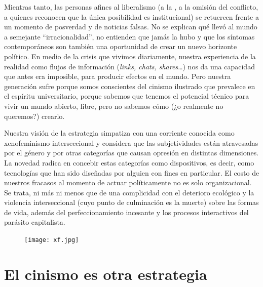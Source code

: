 Mientras tanto, las personas afines al liberalismo (a la , a la omisión del conflicto, a quienes reconocen que la única posibilidad es institucional) se retuercen frente a un momento de posverdad y de noticias falsas. No se explican qué llevó al mundo a semejante \enquote{irracionalidad},\revquotes{} no entienden que jamás la hubo y que los síntomas contemporáneos son también una oportunidad de crear un nuevo horizonte político. En medio de la crisis que vivimos diariamente, nuestra experiencia de la realidad como flujos de información (\emph{links, chats, shares}\ldots{}) nos da una capacidad que antes era imposible, para producir efectos en el mundo. Pero nuestra generación sufre porque somos conscientes del cinismo ilustrado que prevalece en el espíritu universitario, porque sabemos que tenemos el potencial técnico para vivir un mundo abierto, libre, pero no sabemos cómo (¿o realmente no queremos?) crearlo.

Nuestra visión de la estrategia simpatiza con una corriente conocida como xenofeminismo interseccional\addref{} y considera que las subjetividades están atravesadas por el género y por otras categorías que causan opresión en distintas dimensiones. La novedad radica en concebir estas categorías como dispositivos, es decir, como tecnologías que han sido diseñadas por alguien con fines en particular. El costo de nuestros fracasos al momento de actuar políticamente no es solo organizacional. Se trata, ni más ni menos que de una complicidad con el deterioro ecológico y la violencia interseccional (cuyo punto de culminación es la muerte) sobre las formas de vida, además del perfeccionamiento incesante y los procesos interactivos del parásito capitalista.

\begin{figure}[htbp]
	\centering
	\texttt{[image: xf.jpg]}
	\caption{}
	\label{fig:xf}
\end{figure}

\section{El cinismo es otra estrategia}
\label{sec:cinismo}

